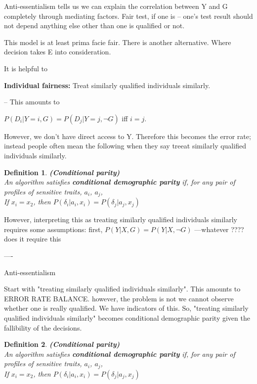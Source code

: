 \documentclass{article}
\newtheorem{definition}{Definition}
\begin{document}
Anti-essentialism tells us we can explain the correlation between Y and G completely through mediating factors. Fair test, if one is -- one's test result should not depend anything else other than one is qualified or not. 

This model is at least prima facie fair. There is another alternative. Where decision takes E into consideration. 


It is helpful to 
    

\textbf{Individual fairness:} Treat similarly qualified individuals similarly. 

-- This amounts to 

$P(D_i|Y=i, G) = P(D_j|Y=j, \neg G)$ iff $i=j$. 

However, we don't have direct access to Y. Therefore this becomes the error rate; instead people often mean the following when they say treeat similarly qualified individuals similarly. 

\begin{definition}
\textup{\textbf{ (Conditional parity) } \\
\indent
An algorithm satisfies \textbf{conditional demographic parity} if, for any pair of profiles of sensitive traits}, $a_i$,  $a_j$, \\

\textup{If } $x_i = x_2$\textup{, then } $P(\delta_i|a_i, x_i) = P(\delta_j|a_j, x_j)$
\end{definition}

However, interpreting this as treating similarly qualified individuals similarly requires some assumptions: first, $P(Y|X, G) = P(Y|X, \neg G)$ ---whatever ????  does it require this

----

Anti-essentialism



Start with "treating similarly qualified individuals similarly". This amounts to ERROR RATE BALANCE. however, the problem is not we cannot observe whether one is really qualified. We have indicators of this. So, "treating similarly qualified individuals similarly" becomes conditional demographic parity given the fallibility of the decisions. 


\begin{definition}
\textup{\textbf{ (Conditional parity) } \\
\indent
An algorithm satisfies \textbf{conditional demographic parity} if, for any pair of profiles of sensitive traits}, $a_i$,  $a_j$, \\

\textup{If } $x_i = x_2$\textup{, then } $P(\delta_i|a_i, x_i) = P(\delta_j|a_j, x_j)$
\end{definition}
\end{document}
